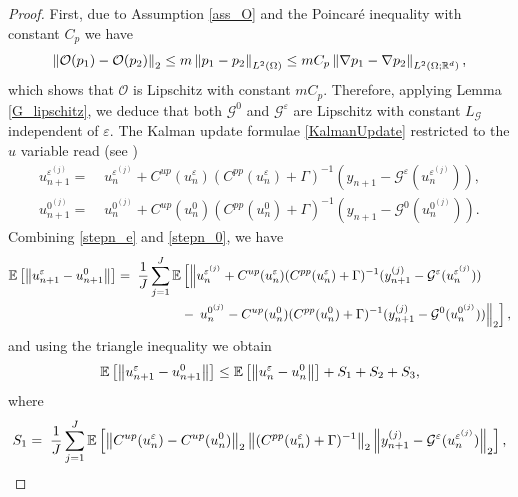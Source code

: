 \documentclass[10pt]{article}
\begin{document}
\begin{proof}
First, due to Assumption \ref{ass_O} and the Poincaré inequality with constant $C_p$ we have
\begin{equation*}
\left\|\mathcal{O}(p_1) - \mathcal{O}(p_2)\right\|_2 \le m \left\|p_1 - p_2\right\|_{L^2(\Omega)} \le m C_p \left\|\nabla p_1 - \nabla p_2\right\|_{L^2(\Omega; \mathbb{R}^d)},
\end{equation*}
which shows that $\mathcal{O}$ is Lipschitz with constant $m C_p$. Therefore, applying Lemma \ref{G_lipschitz}, we deduce that both $\mathcal{G}^0$ and $\mathcal{G}^{\varepsilon}$ are Lipschitz with constant $L_{\mathcal{G}}$ independent of $\varepsilon$. The Kalman update formulae \eqref{KalmanUpdate} restricted to the $u$ variable read (see \cite{ILS13})
\begin{align}
\label{stepn_e}
u_{n+1}^{\varepsilon^{(j)}} = & \; u_{n}^{\varepsilon^{(j)}} + C^{up}(u_n^{\varepsilon}) (C^{pp}(u_n^{\varepsilon}) + \Gamma)^{-1} (y_{n+1} - \mathcal{G}^{\varepsilon}(u_n^{\varepsilon^{(j)}})), \\
\label{stepn_0}
u_{n+1}^{0^{(j)}} = & \; u_{n}^{0^{(j)}} + C^{up}(u_n^{0}) (C^{pp}(u_n^{0}) + \Gamma)^{-1} (y_{n+1} - \mathcal{G}^{0}(u_n^{0^{(j)}})).
\end{align}
Combining \eqref{stepn_e} and \eqref{stepn_0}, we have
\begin{align*}
\mathbb{E} \left [ \left\|u_{n+1}^{\varepsilon} - u_{n+1}^0\right\| \right ]  = \; \frac{1}{J} \sum_{j=1}^J \mathbb{E} &\left [ \left \lVert u_{n}^{\varepsilon^{(j)}} + C^{up}(u_n^{\varepsilon}) (C^{pp}(u_n^{\varepsilon}) + \Gamma)^{-1} (y_{n+1}^{(j)} - \mathcal{G}^{\varepsilon}(u_n^{\varepsilon^{(j)}})) \right. \right. \\
&- \left. \left. u_{n}^{0^{(j)}} - C^{up}(u_n^{0}) (C^{pp}(u_n^{0}) + \Gamma)^{-1} (y_{n+1}^{(j)} - \mathcal{G}^{0}(u_n^{0^{(j)}})) \right \rVert_2 \right ],
\end{align*}
and using the triangle inequality we obtain
\begin{equation}\label{decomp}
\mathbb{E} \left [ \left\|u_{n+1}^{\varepsilon} - u_{n+1}^0\right\| \right ] \leq \operatorname{\mathbb{E}} \left [ \left\|u_n^{\varepsilon} - u_n^0\right\| \right ]  + S_1 + S_2 + S_3,
\end{equation}
where
\begin{align}
\label{2}
S_1 &= \; \frac{1}{J} \sum_{j=1}^J \mathbb{E} \left [ \norm{C^{up}(u_n^{\varepsilon}) - C^{up}(u_n^0)}_2 \norm{(C^{pp}(u_n^{\varepsilon}) + \Gamma)^{-1}}_2 \norm{y_{n+1}^{(j)} - \mathcal{G}^{\varepsilon}(u_n^{\varepsilon^{(j)}})}_2 \right ], \\ \label{3}

\end{align}
\end{proof}
\end{document}
